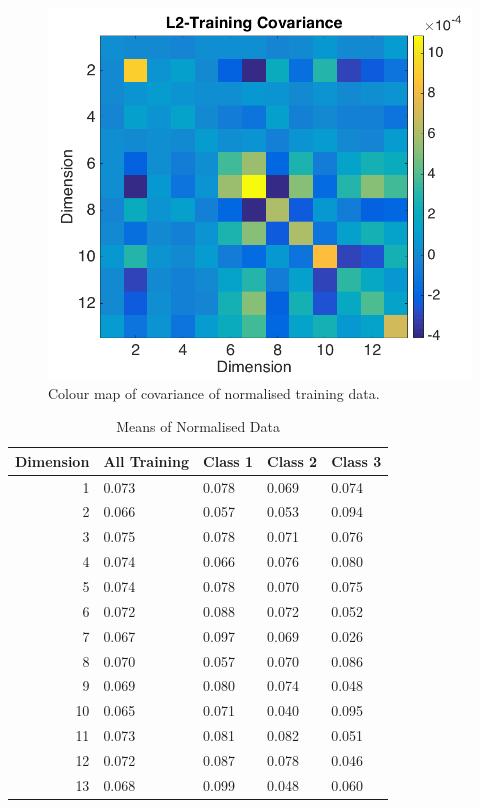 \documentclass[a4paper, 10pt, conference]{ieeeconf}
\begin{document}
\begin{figure}[!ht]
    \centering
    \includegraphics[width=\linewidth]{pic/covl2.png}
    \caption{Colour map of covariance of normalised training data.}
    \label{fig:covl2one}
\end{figure}

\begin{table}[!ht]
\centering
\caption{Means of Normalised Data}
\label{tbl:l2mean}
\begin{tabular}{|r|llll|}
\hline
\textbf{Dimension} & \textbf{All Training} & \textbf{Class 1} & \textbf{Class 2} & \textbf{Class 3} \\ \hline
1 & 0.073 & 0.078 & 0.069 & 0.074\\
2 & 0.066 & 0.057 & 0.053 & 0.094\\
3 & 0.075 & 0.078 & 0.071 & 0.076\\
4 & 0.074 & 0.066 & 0.076 & 0.080\\
5 & 0.074 & 0.078 & 0.070 & 0.075\\
6 & 0.072 & 0.088 & 0.072 & 0.052\\
7 & 0.067 & 0.097 & 0.069 & 0.026\\
8 & 0.070 & 0.057 & 0.070 & 0.086\\
9 & 0.069 & 0.080 & 0.074 & 0.048\\
10 & 0.065 & 0.071 & 0.040 & 0.095\\
11 & 0.073 & 0.081 & 0.082 & 0.051\\
12 & 0.072 & 0.087 & 0.078 & 0.046\\
13 & 0.068 & 0.099 & 0.048 & 0.060\\ \hline
\end{tabular}
\end{table}
\end{document}
